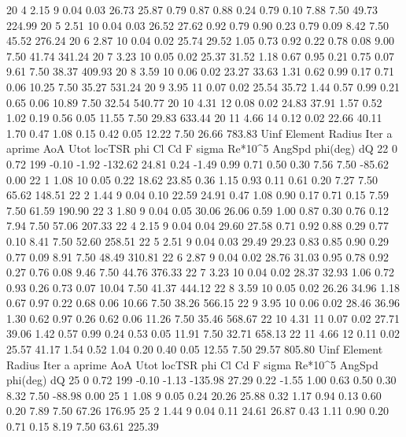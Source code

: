 \begin{pythoncode}
20  4  2.15  9  0.04  0.03  26.73  25.87  0.79  0.87  0.88  0.24  0.79  0.10  7.88  7.50  49.73  224.99
20  5  2.51  10  0.04  0.03  26.52  27.62  0.92  0.79  0.90  0.23  0.79  0.09  8.42  7.50  45.52  276.24
20  6  2.87  10  0.04  0.02  25.74  29.52  1.05  0.73  0.92  0.22  0.78  0.08  9.00  7.50  41.74  341.24
20  7  3.23  10  0.05  0.02  25.37  31.52  1.18  0.67  0.95  0.21  0.75  0.07  9.61  7.50  38.37  409.93
20  8  3.59  10  0.06  0.02  23.27  33.63  1.31  0.62  0.99  0.17  0.71  0.06  10.25  7.50  35.27  531.24
20  9  3.95  11  0.07  0.02  25.54  35.72  1.44  0.57  0.99  0.21  0.65  0.06  10.89  7.50  32.54  540.77
20  10  4.31  12  0.08  0.02  24.83  37.91  1.57  0.52  1.02  0.19  0.56  0.05  11.55  7.50  29.83  633.44
20  11  4.66  14  0.12  0.02  22.66  40.11  1.70  0.47  1.08  0.15  0.42  0.05  12.22  7.50  26.66  783.83
Uinf  Element  Radius  Iter  a  aprime  AoA  Utot  locTSR  phi  Cl  Cd  F  sigma  Re*10^5  AngSpd  phi(deg)  dQ
22  0  0.72  199  -0.10  -1.92  -132.62  24.81  0.24  -1.49  0.99  0.71  0.50  0.30  7.56  7.50  -85.62  0.00
22  1  1.08  10  0.05  0.22  18.62  23.85  0.36  1.15  0.93  0.11  0.61  0.20  7.27  7.50  65.62  148.51
22  2  1.44  9  0.04  0.10  22.59  24.91  0.47  1.08  0.90  0.17  0.71  0.15  7.59  7.50  61.59  190.90
22  3  1.80  9  0.04  0.05  30.06  26.06  0.59  1.00  0.87  0.30  0.76  0.12  7.94  7.50  57.06  207.33
22  4  2.15  9  0.04  0.04  29.60  27.58  0.71  0.92  0.88  0.29  0.77  0.10  8.41  7.50  52.60  258.51
22  5  2.51  9  0.04  0.03  29.49  29.23  0.83  0.85  0.90  0.29  0.77  0.09  8.91  7.50  48.49  310.81
22  6  2.87  9  0.04  0.02  28.76  31.03  0.95  0.78  0.92  0.27  0.76  0.08  9.46  7.50  44.76  376.33
22  7  3.23  10  0.04  0.02  28.37  32.93  1.06  0.72  0.93  0.26  0.73  0.07  10.04  7.50  41.37  444.12
22  8  3.59  10  0.05  0.02  26.26  34.96  1.18  0.67  0.97  0.22  0.68  0.06  10.66  7.50  38.26  566.15
22  9  3.95  10  0.06  0.02  28.46  36.96  1.30  0.62  0.97  0.26  0.62  0.06  11.26  7.50  35.46  568.67
22  10  4.31  11  0.07  0.02  27.71  39.06  1.42  0.57  0.99  0.24  0.53  0.05  11.91  7.50  32.71  658.13
22  11  4.66  12  0.11  0.02  25.57  41.17  1.54  0.52  1.04  0.20  0.40  0.05  12.55  7.50  29.57  805.80
Uinf  Element  Radius  Iter  a  aprime  AoA  Utot  locTSR  phi  Cl  Cd  F  sigma  Re*10^5  AngSpd  phi(deg)  dQ
25  0  0.72  199  -0.10  -1.13  -135.98  27.29  0.22  -1.55  1.00  0.63  0.50  0.30  8.32  7.50  -88.98  0.00
25  1  1.08  9  0.05  0.24  20.26  25.88  0.32  1.17  0.94  0.13  0.60  0.20  7.89  7.50  67.26  176.95
25  2  1.44  9  0.04  0.11  24.61  26.87  0.43  1.11  0.90  0.20  0.71  0.15  8.19  7.50  63.61  225.39

\end{pythoncode}
